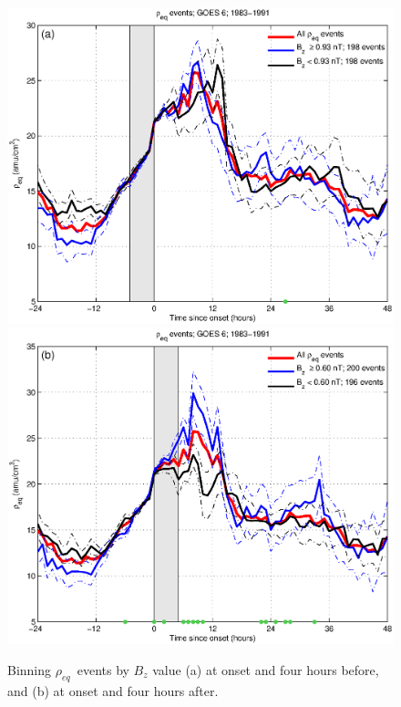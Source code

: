 \documentclass[10pt,twocolumn]{article}
\newcommand{\req}{\ensuremath{\rho_{eq}}}
\begin{document}
\begin{figure}[tp!]
	\centering
	\includegraphics[scale=0.40]{paperfigures/RhoBinnedBz-case24-t020-tf25-GOES6.eps}
	\includegraphics[scale=0.40]{paperfigures/RhoBinnedBz-case24-t025-tf30-GOES6.eps}
	\caption{Binning \req\ events by $B_z$ value (a) at onset and four hours before, and (b) at onset and four hours after.}
	\label{fig:RhoBinned}
\end{figure}
\end{document}
